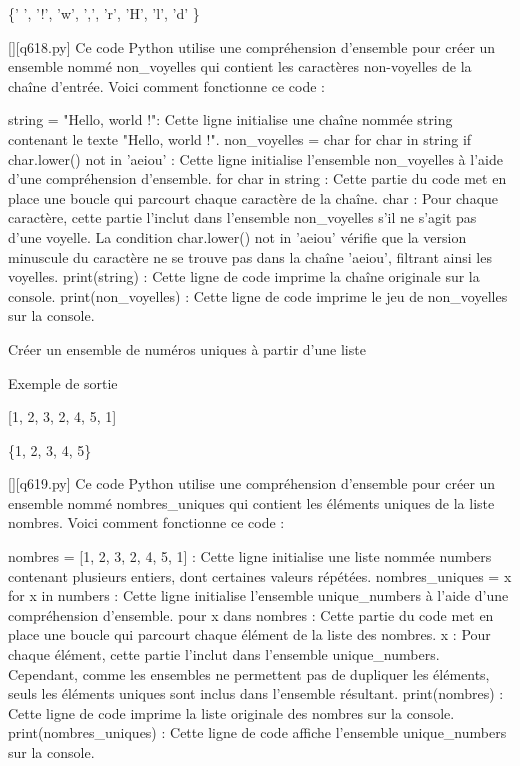 \{' ', '!', 'w', ',', 'r', 'H', 'l', 'd' \}
        \par
        \begin{solution}
            \renewcommand{\nomfichier}{q618.py}
            \pythonfile{\chemincode \nomfichier}[][\nomfichier]
            Ce code Python utilise une compréhension d'ensemble pour créer un ensemble nommé non_voyelles qui contient les caractères non-voyelles de la chaîne d'entrée. Voici comment fonctionne ce code :

    string = "Hello, world !": Cette ligne initialise une chaîne nommée string contenant le texte "Hello, world !".
    non_voyelles = {char for char in string if char.lower() not in 'aeiou'} : Cette ligne initialise l'ensemble non_voyelles à l'aide d'une compréhension d'ensemble.
        for char in string : Cette partie du code met en place une boucle qui parcourt chaque caractère de la chaîne.
        {char} : Pour chaque caractère, cette partie l'inclut dans l'ensemble non_voyelles s'il ne s'agit pas d'une voyelle. La condition char.lower() not in 'aeiou' vérifie que la version minuscule du caractère ne se trouve pas dans la chaîne 'aeiou', filtrant ainsi les voyelles.
    print(string) : Cette ligne de code imprime la chaîne originale sur la console.
    print(non_voyelles) : Cette ligne de code imprime le jeu de non_voyelles sur la console.
        \end{solution}
        

        \question
        Créer un ensemble de numéros uniques à partir d'une liste

Exemple de sortie

[1, 2, 3, 2, 4, 5, 1]

\{1, 2, 3, 4, 5\}
        \par
        \begin{solution}
            \renewcommand{\nomfichier}{q619.py}
            \pythonfile{\chemincode \nomfichier}[][\nomfichier]
            Ce code Python utilise une compréhension d'ensemble pour créer un ensemble nommé nombres_uniques qui contient les éléments uniques de la liste nombres. Voici comment fonctionne ce code :

    nombres = [1, 2, 3, 2, 4, 5, 1] : Cette ligne initialise une liste nommée numbers contenant plusieurs entiers, dont certaines valeurs répétées.
    nombres_uniques = {x for x in numbers} : Cette ligne initialise l'ensemble unique_numbers à l'aide d'une compréhension d'ensemble.
        pour x dans nombres : Cette partie du code met en place une boucle qui parcourt chaque élément de la liste des nombres.
        {x} : Pour chaque élément, cette partie l'inclut dans l'ensemble unique_numbers. Cependant, comme les ensembles ne permettent pas de dupliquer les éléments, seuls les éléments uniques sont inclus dans l'ensemble résultant.
    print(nombres) : Cette ligne de code imprime la liste originale des nombres sur la console.
    print(nombres_uniques) : Cette ligne de code affiche l'ensemble unique_numbers sur la console.
        \end{solution}
        


